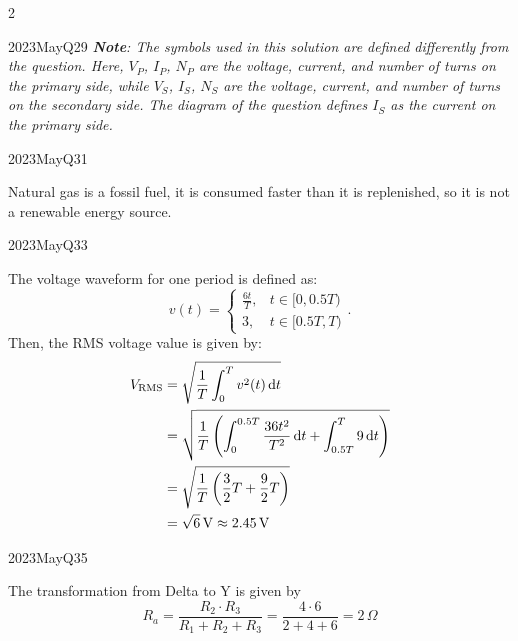 \begin{multicols*}{2}
\begin{qsolution}{2023}{May}{Q29}{\tgEE \tgEETransformer}
    \textit{
        {\bfseries Note}:
        The symbols used in this solution are defined differently from the question.
        Here, $V_P$, $I_P$, $N_P$ are the voltage, current, and number of turns on the primary side, while $V_S$, $I_S$, $N_S$ are the voltage, current, and number of turns on the secondary side.
        The diagram of the question defines $I_S$ as the current on the primary side.
    }
\end{qsolution}

\begin{qsolution}{2023}{May}{Q31}{\tgEE \tgEERenewableEnergy}

    Natural gas is a fossil fuel, it is consumed faster than it is replenished, so it is not a renewable energy source.
\end{qsolution}

\begin{qsolution}[20]{2023}{May}{Q33}{\tgEE \tgEEPowerSystems \tgEERMS}

    The voltage waveform for one period is defined as:
    \[
        v(t)=\begin{cases}
            \frac{6t}{T}, & t\in[0, 0.5T) \\
            3, & t\in[0.5T, T)
        \end{cases}.
    \]
    Then, the RMS voltage value is given by:
    \begin{align*}
        V_{\mathrm{RMS}} &=
        \sqrt{\frac{1}{T}\int_{0}^{T} v^2(t)\,\mathrm{d} t} \\
        &= \sqrt{\frac{1}{T}\left(\int_0^{0.5T}\frac{36t^2}{T^2}\,\mathrm{d} t + \int_{0.5T}^{T} 9\,\mathrm{d} t\right)} \\
        &= \sqrt{\frac{1}{T}\left(\frac{3}{2}T+\frac{9}{2}T\right)} \\
        &= \sqrt{6}\,\mathrm{V} \approx 2.45\,\mathrm{V}
    \end{align*}
\end{qsolution}

\begin{qsolution}{2023}{May}{Q35}{\tgEE \tgEEDeltaY}

    The transformation from Delta to Y is given by
    \[R_a=\frac{R_2\cdot R_3}{R_1+R_2+R_3}=\frac{4\cdot 6}{2+4+6}=2\,\Omega\]
\end{qsolution}

\end{multicols*}